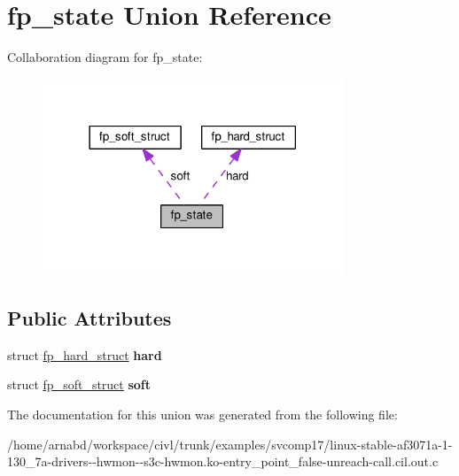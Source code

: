 \hypertarget{unionfp__state}{}\section{fp\+\_\+state Union Reference}
\label{unionfp__state}


Collaboration diagram for fp\+\_\+state\+:
\nopagebreak
\begin{figure}[H]
\begin{center}
\leavevmode
\includegraphics[width=254pt]{unionfp__state__coll__graph}
\end{center}
\end{figure}
\subsection*{Public Attributes}
\begin{DoxyCompactItemize}
\item 
\hypertarget{unionfp__state_a8759fc7eb17aad07c68a1c504e76a807}{}struct \hyperlink{structfp__hard__struct}{fp\+\_\+hard\+\_\+struct} {\bfseries hard}\label{unionfp__state_a8759fc7eb17aad07c68a1c504e76a807}

\item 
\hypertarget{unionfp__state_a5ee81496b2980058e7cc61d5e589fabd}{}struct \hyperlink{structfp__soft__struct}{fp\+\_\+soft\+\_\+struct} {\bfseries soft}\label{unionfp__state_a5ee81496b2980058e7cc61d5e589fabd}

\end{DoxyCompactItemize}


The documentation for this union was generated from the following file\+:\begin{DoxyCompactItemize}
\item 
/home/arnabd/workspace/civl/trunk/examples/svcomp17/linux-\/stable-\/af3071a-\/1-\/130\+\_\+7a-\/drivers-\/-\/hwmon-\/-\/s3c-\/hwmon.\+ko-\/entry\+\_\+point\+\_\+false-\/unreach-\/call.\+cil.\+out.\+c\end{DoxyCompactItemize}
